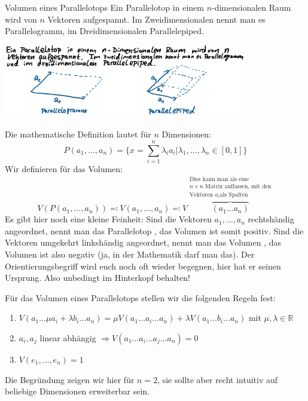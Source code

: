 \begin{Beispiel}{Volumen eines Parallelotops}
Ein Parallelotop in einem $n$-dimensionalen Raum wird von $n$ Vektoren aufgespannt. Im Zweidimensionalen nennt man es
Parallelogramm, im Dreidimensionalen Parallelepiped.

\includegraphics[width=0.8\textwidth]{Dateien/00/14Parallelotop1.png}

Die mathematische Definition lautet für $n$ Dimensionen:
\begin{equation}
    P(a_1, \ldots, a_n) = \{ x = \sum_{i=1}^n \lambda_i a_i | \lambda_1, \ldots, \lambda_n \in [0,1] \}
\end{equation}
Wir definieren für das Volumen:
\begin{equation}
    V(P(a_1, \ldots, a_n)) \eqqcolon V(a_1, \ldots, a_n) \eqqcolon V\overbrace{(a_1 \ldots a_n)}^{\substack{\text{Dies
    kann man als eine}\\ n\times n\text{ Matrix auffassen, mit den}\\\text{Vektoren }a_i\text{als Spalten}}}
\end{equation}
Es gibt hier noch eine kleine Feinheit: Sind die Vektoren $a_1, \ldots, a_n$ rechtshändig angeordnet, nennt man das
Parallelotop , das Volumen ist somit positiv. Sind die Vektoren umgekehrt linkshändig
angeordnet, nennt man das Volumen , das Volumen ist also negativ (ja, in der Mathematik darf man
das). Der Orientierungsbegriff wird euch noch oft wieder begegnen, hier hat er seinen Ursprung. Also unbedingt im
Hinterkopf behalten!

Für das Volumen eines Parallelotops stellen wir die folgenden Regeln fest:
\begin{enumerate}
    \item $V(a_1\ldots \mu a_i + \lambda b_i \ldots a_n) = \mu V(a_1 \ldots a_i \ldots a_n) + \lambda V(a_1 \ldots b_i
        \ldots a_n)$ mit $\mu, \lambda \in \mathds{R}$
    \item $a_i, a_j$ linear abhängig $\Rightarrow V(a_1 \ldots a_i \ldots a_j \ldots a_n) = 0$
    \item $V(e_1, \ldots, e_n) = 1$
\end{enumerate}
Die Begründung zeigen wir hier für $n=2$, sie sollte aber recht intuitiv auf beliebige Dimensionen erweiterbar sein.


\end{Beispiel}
